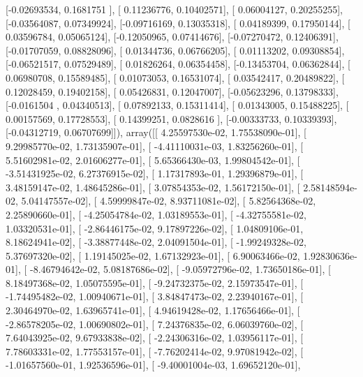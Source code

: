 \documentclass{article}
\begin{document}
       [-0.02693534,  0.1681751 ],
       [ 0.11236776,  0.10402571],
       [ 0.06004127,  0.20255255],
       [-0.03564087,  0.07349924],
       [-0.09716169,  0.13035318],
       [ 0.04189399,  0.17950144],
       [ 0.03596784,  0.05065124],
       [-0.12050965,  0.07414676],
       [-0.07270472,  0.12406391],
       [-0.01707059,  0.08828096],
       [ 0.01344736,  0.06766205],
       [ 0.01113202,  0.09308854],
       [-0.06521517,  0.07529489],
       [ 0.01826264,  0.06354458],
       [-0.13453704,  0.06362844],
       [ 0.06980708,  0.15589485],
       [ 0.01073053,  0.16531074],
       [ 0.03542417,  0.20489822],
       [ 0.12028459,  0.19402158],
       [ 0.05426831,  0.12047007],
       [-0.05623296,  0.13798333],
       [-0.0161504 ,  0.04340513],
       [ 0.07892133,  0.15311414],
       [ 0.01343005,  0.15488225],
       [ 0.00157569,  0.17728553],
       [ 0.14399251,  0.0828616 ],
       [-0.00333733,  0.10339393],
       [-0.04312719,  0.06707699]]), array([[  4.25597530e-02,   1.75538090e-01],
       [  9.29985770e-02,   1.73135907e-01],
       [ -4.41110031e-03,   1.83256260e-01],
       [  5.51602981e-02,   2.01606277e-01],
       [  5.65366430e-03,   1.99804542e-01],
       [ -3.51431925e-02,   6.27376915e-02],
       [  1.17317893e-01,   1.29396879e-01],
       [  3.48159147e-02,   1.48645286e-01],
       [  3.07854353e-02,   1.56172150e-01],
       [  2.58148594e-02,   5.04147557e-02],
       [  4.59999847e-02,   8.93711081e-02],
       [  5.82564368e-02,   2.25890660e-01],
       [ -4.25054784e-02,   1.03189553e-01],
       [ -4.32755581e-02,   1.03320531e-01],
       [ -2.86446175e-02,   9.17897226e-02],
       [  1.04809106e-01,   8.18624941e-02],
       [ -3.38877448e-02,   2.04091504e-01],
       [ -1.99249328e-02,   5.37697320e-02],
       [  1.19145025e-02,   1.67132923e-01],
       [  6.90063466e-02,   1.92830636e-01],
       [ -8.46794642e-02,   5.08187686e-02],
       [ -9.05972796e-02,   1.73650186e-01],
       [  8.18497368e-02,   1.05075595e-01],
       [ -9.24732375e-02,   2.15973547e-01],
       [ -1.74495482e-02,   1.00940671e-01],
       [  3.84847473e-02,   2.23940167e-01],
       [  2.30464970e-02,   1.63965741e-01],
       [  4.94619428e-02,   1.17656466e-01],
       [ -2.86578205e-02,   1.00690802e-01],
       [  7.24376835e-02,   6.06039760e-02],
       [  7.64043925e-02,   9.67933838e-02],
       [ -2.24306316e-02,   1.03956117e-01],
       [  7.78603331e-02,   1.77553157e-01],
       [ -7.76202414e-02,   9.97081942e-02],
       [ -1.01657560e-01,   1.92536596e-01],
       [ -9.40001004e-03,   1.69652120e-01],
\end{document}
